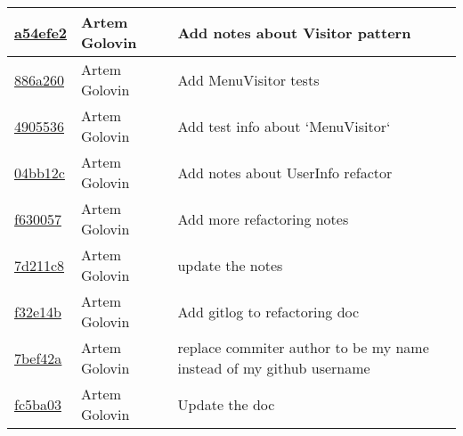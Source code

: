 \begin{tabularx}{\textwidth}{l l X}
\href{https://github.com/awave1/assessment-loan-system/commit/a54efe2612111bb5b273db3377973cb740a51d55}{a54efe2} & Artem Golovin & Add notes about Visitor pattern\\ \hline
\href{https://github.com/awave1/assessment-loan-system/commit/886a2605f749282f45e9ef8c3c4cbe1762a68799}{886a260} & Artem Golovin & Add MenuVisitor tests\\ \hline
\href{https://github.com/awave1/assessment-loan-system/commit/490553677b59d77926ab6a3eee321a2cc350be1f}{4905536} & Artem Golovin & Add test info about `MenuVisitor`\\ \hline
\href{https://github.com/awave1/assessment-loan-system/commit/04bb12ca11d0e76f57607a9481ea5954787117b0}{04bb12c} & Artem Golovin & Add notes about UserInfo refactor\\ \hline
\href{https://github.com/awave1/assessment-loan-system/commit/f630057ca876e3222e614dc4797ef0cf1399c42d}{f630057} & Artem Golovin & Add more refactoring notes\\ \hline
\href{https://github.com/awave1/assessment-loan-system/commit/7d211c8d1556f10a63d8a0dcc3697ce279695a29}{7d211c8} & Artem Golovin & update the notes\\ \hline
\href{https://github.com/awave1/assessment-loan-system/commit/f32e14bad9c46a5fedc7f3564c868cbc29ee74f2}{f32e14b} & Artem Golovin & Add gitlog to refactoring doc\\ \hline
\href{https://github.com/awave1/assessment-loan-system/commit/7bef42a766618e5eda54960d929c7182e1cacbe4}{7bef42a} & Artem Golovin & replace commiter author to be my name instead of my github username\\ \hline
\href{https://github.com/awave1/assessment-loan-system/commit/fc5ba037a3e802fb31c9e66050e4b7160a08cdf2}{fc5ba03} & Artem Golovin & Update the doc\\ \hline
\end{tabularx}
